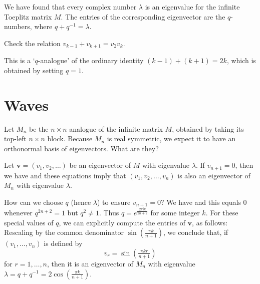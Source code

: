 \documentclass[10pt]{amsart}
\theoremstyle{mythm}
\theoremstyle{definition}
\theoremstyle{myrmk}
\begin{document}
	We have found that every complex number $\lambda$ is an eigenvalue for the infinite Toeplitz matrix $M$. The entries of the corresponding eigenvector are the $q$-numbers, where $q + q^{-1} = \lambda$. 
	
	 Check the relation $v_{k-1} + v_{k+1} = v_2v_k$.
	
	This is a `$q$-analogue' of the ordinary identity $(k-1) + (k+1) = 2k$, which is obtained by setting $q = 1$. 
	
	\newpage
	
	\section{Waves} 
	
	Let $M_n$ be the $n \times n$ analogue of the infinite matrix $M$, obtained by taking its top-left $n \times n$ block. Because $M_n$ is real symmetric, we expect it to have an orthonormal basis of eigenvectors. What are they? 
	
	Let $\bm{v} = (v_1, v_2, \ldots)$ be an eigenvector of $M$ with eigenvalue $\lambda$. If $v_{n+1} = 0$, then we have 
	and these equations imply that $(v_1, v_2, \ldots, v_n)$ is also an eigenvector of $M_n$ with eigenvalue $\lambda$. 
	
	How can we choose $q$ (hence $\lambda$) to ensure $v_{n+1} = 0$? We have 
	and this equals 0 whenever $q^{2n+2} = 1$ but $q^2 \neq 1$. Thus $q = e^{\frac{2 \pi i k}{2n+2}}$ for some integer $k$. For these special values of $q$, we can explicitly compute the entries of $\bm{v}$, as follows: 
	Rescaling by the common denominator $\sin(\tfrac{\pi k}{n+1})$, we conclude that, if $(v_1, \ldots, v_n)$ is defined by 
	\[
		v_r = \sin(\tfrac{\pi kr}{n+1})
	\]
	for $r = 1, \ldots, n$, then it is an eigenvector of $M_n$ with eigenvalue $\lambda = q + q^{-1} = 2 \cos(\frac{\pi k}{n+1})$. 
	
\end{document}
